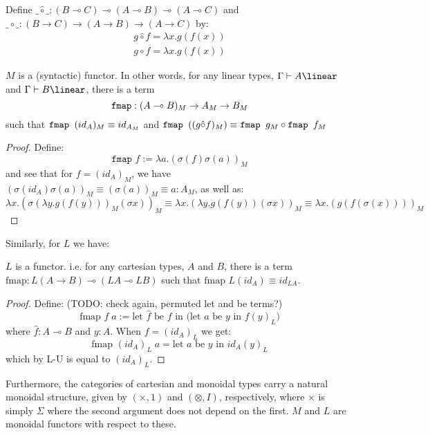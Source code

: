\begin{defn}Define $\_\hat \circ\_ : (B \multimap C) \multimap (A \multimap B) \multimap (A \multimap C)$ and $\_ \circ\_ : (B \to C) \to (A \to B) \to (A \to C)$ by:
  \[
    \begin{split}
    g \hat \circ f = \lambda x. g(f(x))\\
    g \circ f = \lambda x. g(f(x))
    \end{split}
  \]
\end{defn}

\begin{thm}\label{Mfunc}
  $M$ is a (syntactic) functor. In other words, for any linear types, $\Gamma \vdash A \linear$ and $\Gamma \vdash B \linear$, there is a term
\[
  \textup{\texttt{fmap}} : (A \multimap B)_M \to A_M \to B_M
  \]
such that $\textup{\texttt{fmap }} (id_A)_M \equiv id_{A_M}$ and $\textup{\texttt{fmap }} ((g \hat \circ f)_M) \equiv \textup{\texttt{fmap }} g_M \circ \textup{\texttt{fmap }} f_M$
  \begin{proof}
  Define:
  \[
    \texttt{fmap }f := \lambda a. (\sigma(f)\sigma(a))_M
  \]
  and see that for $f = (id_A)_M$, we have $(\sigma(id_A)\sigma(a))_M \equiv (\sigma(a))_M \equiv a : A_M$, as well as:
  \[
    \lambda x. (\sigma(\lambda y. g(f(y)))_M(\sigma x))_M \equiv \lambda x. (\lambda y. g(f(y))(\sigma x))_M \equiv \lambda x. (g(f(\sigma(x))))_M
  \]
\end{proof}
\end{thm}
Similarly, for $L$ we have:
\begin{thm}
  $L$ is a functor. i.e. for any cartesian types, $A$ and $B$, there is a term $\text{fmap} : L(A \to B) \multimap (LA \multimap LB)$ such that $\text{fmap } L(id_A) \equiv id_{LA}$.
  \begin{proof}
  Define: (TODO: check again, permuted let and be terms?)
  \[
    \text{fmap } f \; a := \text{let $\hat f$ be $f$ in (let $a$ be $y$ in $f(y)_L$)}
  \]
  where $\hat f : A \multimap B$ and $y : A$. When $f = (id_A)_L$ we get:
  \[
    \text{fmap } (id_A)_L \; a = \text{let $a$ be $y$ in $id_A(y)_L$}
  \]
  which by L-U is equal to $(id_A)_L$.
\end{proof}
\end{thm}
Furthermore, the categories of cartesian and monoidal types carry a natural monoidal structure, given by $(\times, 1)$ and $(\otimes, I)$, respectively, where $\times$ is simply $\Sigma$ where the second argument does not depend on the first. $M$ and $L$ are monoidal functors with respect to these.\\

